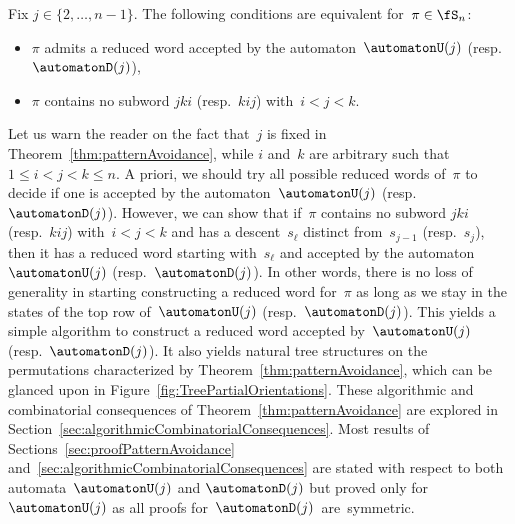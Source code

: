 \begin{theorem}\label{thm:patternAvoidance}
Fix $j \in \{2, \dots, n-1\}$.
The following conditions are equivalent for~${\pi \in \fS_n}$:
\begin{itemize}
	\item $\pi$ admits a reduced word accepted by the automaton~$\automatonU(j)$ (resp.~$\automatonD(j)$),
	\item $\pi$ contains no subword $jki$ (resp.~$kij$) with~$i < j < k$.
\end{itemize}
\end{theorem}

Let us warn the reader on the fact that~$j$ is fixed in Theorem~\ref{thm:patternAvoidance}, while $i$ and~$k$ are arbitrary such that~$1 \le i < j < k \le n$.
A priori, we should try all possible reduced words of~$\pi$ to decide if one is accepted by the automaton~$\automatonU(j)$ (resp.~$\automatonD(j)$).
However, we can show that if~$\pi$ contains no subword $jki$ (resp.~$kij$) with~${i < j < k}$ and has a descent~$s_\ell$ distinct from~$s_{j-1}$ (resp.~$s_j$), then it has a reduced word starting with~$s_\ell$ and accepted by the automaton~$\automatonU(j)$ (resp.~$\automatonD(j)$).
In other words, there is no loss of generality in starting constructing a reduced word for~$\pi$ as long as we stay in the states of the top row of~$\automatonU(j)$ (resp.~$\automatonD(j)$).
This yields a simple algorithm to construct a reduced word accepted by~$\automatonU(j)$ (resp.~$\automatonD(j)$).
It also yields natural tree structures on the permutations characterized by Theorem~\ref{thm:patternAvoidance}, which can be glanced upon in Figure~\ref{fig:TreePartialOrientations}.
These algorithmic and combinatorial consequences of Theorem~\ref{thm:patternAvoidance} are explored in Section~\ref{sec:algorithmicCombinatorialConsequences}.
Most results of Sections~\ref{sec:proofPatternAvoidance} and~\ref{sec:algorithmicCombinatorialConsequences} are stated with respect to both automata~$\automatonU(j)$ and $\automatonD(j)$ but proved only for $\automatonU(j)$ as all proofs for~$\automatonD(j)$~are~symmetric.

